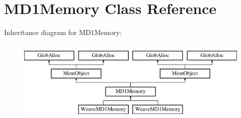 \hypertarget{classMD1Memory}{\section{M\-D1\-Memory Class Reference}
\label{classMD1Memory}
}
Inheritance diagram for M\-D1\-Memory\-:\begin{figure}[H]
\begin{center}
\leavevmode
\includegraphics[height=4.000000cm]{classMD1Memory}
\end{center}
\end{figure}
